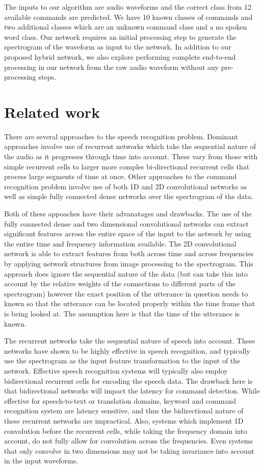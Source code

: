 \documentclass{article}
\begin{document}
The inputs to our algorithm are audio waveforms and the correct class
from 12 available commands are predicted. We have 10 known classes of
commands and two additional classes which are an unknown command class
and a no spoken word class. Our network requires an initial processing
step to generate the spectrogram of the waveform as input to the
network. In addition to our proposed hybrid network, we also explore
performing complete end-to-end processing in our network from the raw
audio waveform without any pre-processing steps. 

\section{Related work}
There are several approaches to the speech recognition
problem. Dominant approaches involve use of recurrent networks which
take the sequential nature of the audio as it progresses through time
into account. These vary from those with simple recurrent cells to
larger more comples bi-directional recurrent cells that process large
segments of time at once\cite{amodei2016deep}. Other approaches to the
command recognition
problem involve use of both 1D and 2D convolutional
networks\cite{oxerin-baseline, arik2017convolutional} as well
as simple fully connected dense networks over the spectrogram of the
data.

Both of these appoaches have their advanatages and drawbacks. The use
of the fully connected dense and two dimensional convolutional
networks can extract significant features across the entire space of
the input to the network by using the entire time and frequency
information available\cite{hinton2012deep}. The 2D convolutional
network is able to extract
features from both across time and across frequencies by applying
network structures from image processing to the
spectrogram\cite{sainath2015convolutional}. This
approach does ignore the sequential nature of the data (but can take
this into account by the relative weights of the connections to
different parts of the spectrogram) however the exact position of the
utterance in question needs to known so that the utterance can be
located properly within the time frame that is being looked at. The
assumption here is that the time of the utterance is known.

The recurrent networks take the sequential nature of speech into
account. These networks have shown to be highly effective in speech
recognition, and typically use the spectrogram as the input feature
transformation to the input of the network. Effective speech
recognition systems will typically also employ bidirectional recurrent
cells for encoding the speech data\cite{zhang2017hello}. The drawback
here is that
bidirectional networks will impact the latency for command
detection. While effective for speech-to-text or translation domains,
keyword and command recognition system are latency sensitive, and thus
the bidirectional nature of these recurrent networks are
impractical. Also, systems which implement 1D convolution before the
recurrent cells, while taking the frequency domain into account, do
not fully allow for convolution across the frequencies. Even systems
that only convolve in two dimensions may not be taking invariance into
account in the input waveforms.
\end{document}
